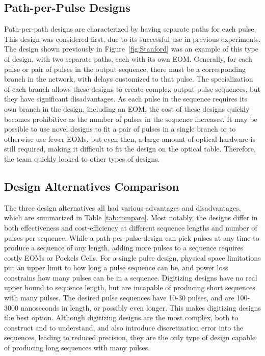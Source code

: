 \documentclass[pdftex,12pt,a4paper]{article}
\begin{document}
\subsection{Path-per-Pulse Designs}
Path-per-path designs are characterized by having separate paths for each pulse. This design was considered first, due to its successful use in previous experiments. The design shown previously in Figure~\ref{fig:Stanford} was an example of this type of design, with two separate paths, each with its own EOM. Generally,  for each pulse or pair of pulses in the output sequence, there must be a corresponding branch in the network, with delays customized to that pulse. The specialization of each branch allows these designs to create complex output pulse sequences, but they have significant disadvantages. As each pulse in the sequence requires its own branch in the design, including an EOM, the cost of these designs quickly becomes prohibitive as the number of pulses in the sequence increases. It may be possible to use novel designs to fit a pair of pulses in a single branch or to otherwise use fewer EOMs, but even then, a large amount of optical hardware is still required, making it difficult to fit the design on the optical table. Therefore, the team quickly looked to other types of designs.


\subsection{Design Alternatives Comparison}
\label{sec:comparison}

The three design alternatives all had various advantages and disadvantages, which are summarized in Table \ref{tab:compare}. Most notably, the designs differ in both effectiveness and cost-efficiency at different sequence lengths and number of pulses per sequence. While a path-per-pulse design can pick pulses at any time to produce a sequence of any length, adding more pulses to a sequence requires costly EOMs or Pockels Cells. For a single pulse design, physical space limitations put an upper limit to how long a pulse sequence can be, and power loss constrains how many pulses can be in a sequence. Digitizing designs have no real upper bound to sequence length, but are incapable of producing short sequences with many pulses. The desired pulse sequences have 10-30 pulses, and are 100-3000 nanoseconds in length, or possibly even longer. This makes digitizing designs the best option. Although digitizing designs are the most complex, both to construct and to understand, and also introduce discretization error into the sequences, leading to reduced precision, they are the only type of design capable of producing long sequences with many pulses.
\end{document}
